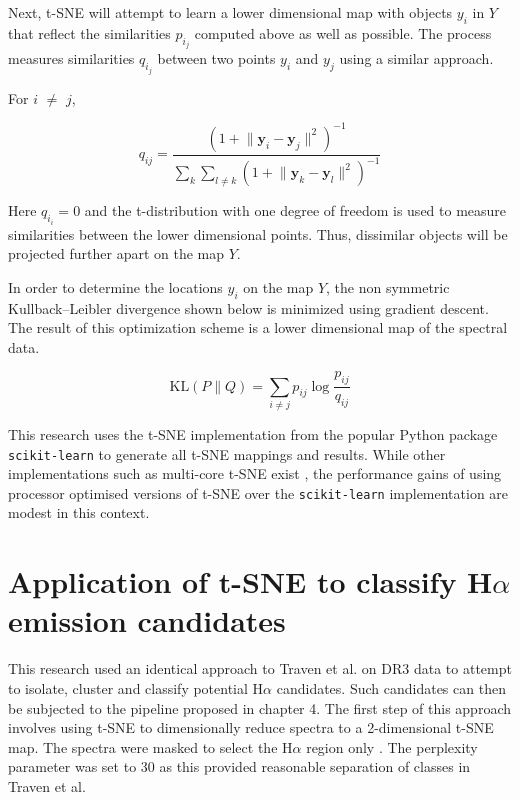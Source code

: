 Next, t-SNE will attempt to learn a lower dimensional map with objects $y_i$ in $Y$ that reflect the similarities $p_i_j$ computed above as well as possible. The process measures similarities $q_i_j$ between two points $y_i$ and $y_j$ using a similar approach. 

For $i$ $\neq$ $j$,

\begin{equation}
    q_{ij}={\frac {(1+\lVert \mathbf {y} _{i}-\mathbf {y} _{j}\rVert ^{2})^{-1}}{\sum _{k}\sum _{l\neq k}(1+\lVert \mathbf {y} _{k}-\mathbf {y} _{l}\rVert ^{2})^{-1}}}
\end{equation}

Here $q_i_i=0$ and the t-distribution with one degree of freedom is used to measure similarities between the lower dimensional points. Thus, dissimilar objects will be projected further apart on the map $Y$.

In order to determine the locations $y_i$ on the map $Y$, the non symmetric Kullback–Leibler divergence shown below is minimized using gradient descent. The result of this optimization scheme is a lower dimensional map of the spectral data.

\begin{equation}
    \mathrm {KL} \left(P\parallel Q\right)=\sum _{i\neq j}p_{ij}\log {\frac {p_{ij}}{q_{ij}}}
\end{equation}

This research uses the t-SNE implementation from the popular Python package \texttt{scikit-learn} to generate all t-SNE mappings and results. While other implementations such as multi-core t-SNE exist \cite{Ulyanov2016}, the performance gains of using processor optimised versions of t-SNE over the \texttt{scikit-learn} implementation are modest in this context.

\section{Application of t-SNE to classify H$\alpha$ emission candidates}

This research used an identical approach to Traven et al. on DR3 data to attempt to isolate, cluster and classify potential H$\alpha$ candidates. Such candidates can then be subjected to the pipeline proposed in chapter 4. The first step of this approach involves using t-SNE to dimensionally reduce spectra to a 2-dimensional t-SNE map. The spectra were masked to select the H$\alpha$ region only \cite{traven2017galah}. The perplexity parameter was set to 30 as this provided reasonable separation of classes in Traven et al.

